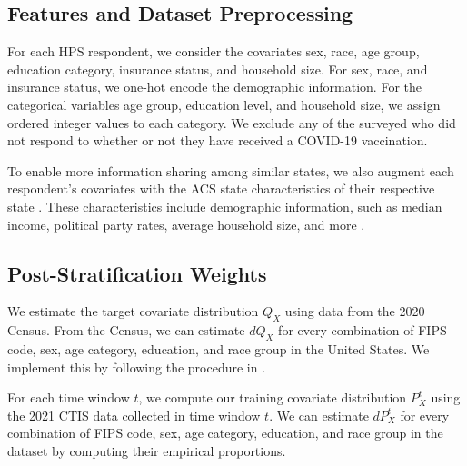 \subsection{Features and Dataset Preprocessing}


For each HPS respondent, we consider the covariates sex, race, age group, education category, insurance status, and household size. For sex, race, and insurance status, we one-hot encode the demographic information. For the categorical variables age group, education level, and household size, we assign ordered integer values to each category. We exclude any of the surveyed who did not respond to whether or not they have received a COVID-19 vaccination.

To enable more information sharing among similar states, we also augment each respondent's covariates with the ACS state characteristics of their respective state . These characteristics include demographic information, such as median income, political party rates, average household size, and more .

\subsection{Post-Stratification Weights}
We estimate the target covariate distribution $Q_{X}$ using data from the 2020 Census. From the Census, we can estimate $dQ_{X}$ for every combination of FIPS code, sex, age category, education, and race group in the United States. We implement this by following the procedure in \citet{royal2019survey}.

For each time window $t$, we compute our training covariate distribution $P_{X}^{t}$ using the 2021 CTIS data collected in time window $t$. We can estimate $dP_{X}^{t}$ for every combination of FIPS code, sex, age category, education, and race group in the dataset by computing their empirical proportions.

